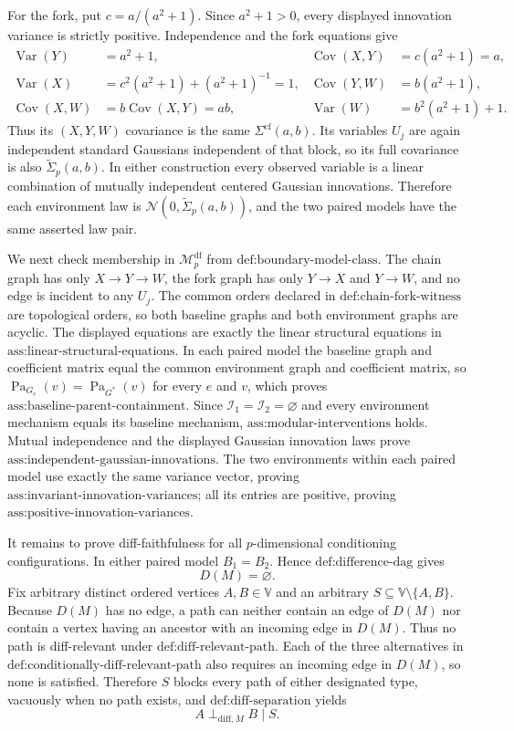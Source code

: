 For the fork, put \(c=a/(a^2+1)\).  Since \(a^2+1>0\), every displayed innovation variance is strictly positive.  Independence and the fork equations give
\[
\begin{aligned}
 \operatorname{Var}(Y)&=a^2+1,
 &\operatorname{Cov}(X,Y)&=c(a^2+1)=a,\\
 \operatorname{Var}(X)&=c^2(a^2+1)+(a^2+1)^{-1}=1,
 &\operatorname{Cov}(Y,W)&=b(a^2+1),\\
 \operatorname{Cov}(X,W)&=b\operatorname{Cov}(X,Y)=ab,
 &\operatorname{Var}(W)&=b^2(a^2+1)+1.
\end{aligned}
\]
Thus its \((X,Y,W)\) covariance is the same \(\Sigma^{\mathrm{cf}}(a,b)\).  Its variables \(U_j\) are again independent standard Gaussians independent of that block, so its full covariance is also \(\widetilde\Sigma_p(a,b)\).  In either construction every observed variable is a linear combination of mutually independent centered Gaussian innovations.  Therefore each environment law is \(\mathcal N(0,\widetilde\Sigma_p(a,b))\), and the two paired models have the same asserted law pair.

We next check membership in \(\mathcal M_p^{\mathrm{df}}\) from \(\text{def:boundary-model-class}\).  The chain graph has only \(X\to Y\to W\), the fork graph has only \(Y\to X\) and \(Y\to W\), and no edge is incident to any \(U_j\).  The common orders declared in \(\text{def:chain-fork-witness}\) are topological orders, so both baseline graphs and both environment graphs are acyclic.  The displayed equations are exactly the linear structural equations in \(\text{ass:linear-structural-equations}\).  In each paired model the baseline graph and coefficient matrix equal the common environment graph and coefficient matrix, so \(\operatorname{Pa}_{G_e}(v)=\operatorname{Pa}_{G^*}(v)\) for every \(e\) and \(v\), which proves \(\text{ass:baseline-parent-containment}\).  Since \(\mathcal I_1=\mathcal I_2=\varnothing\) and every environment mechanism equals its baseline mechanism, \(\text{ass:modular-interventions}\) holds.  Mutual independence and the displayed Gaussian innovation laws prove \(\text{ass:independent-gaussian-innovations}\).  The two environments within each paired model use exactly the same variance vector, proving \(\text{ass:invariant-innovation-variances}\); all its entries are positive, proving \(\text{ass:positive-innovation-variances}\).

It remains to prove diff-faithfulness for all \(p\)-dimensional conditioning configurations.  In either paired model \(B_1=B_2\).  Hence \(\text{def:difference-dag}\) gives
\[
 D(M)=\varnothing.
\]
Fix arbitrary distinct ordered vertices \(A,B\in\mathbb V\) and an arbitrary \(S\subseteq\mathbb V\setminus\{A,B\}\).  Because \(D(M)\) has no edge, a path can neither contain an edge of \(D(M)\) nor contain a vertex having an ancestor with an incoming edge in \(D(M)\).  Thus no path is diff-relevant under \(\text{def:diff-relevant-path}\).  Each of the three alternatives in \(\text{def:conditionally-diff-relevant-path}\) also requires an incoming edge in \(D(M)\), so none is satisfied.  Therefore \(S\) blocks every path of either designated type, vacuously when no path exists, and \(\text{def:diff-separation}\) yields
\[
 A\perp_{\mathrm{diff},M}B\mid S.
\]

